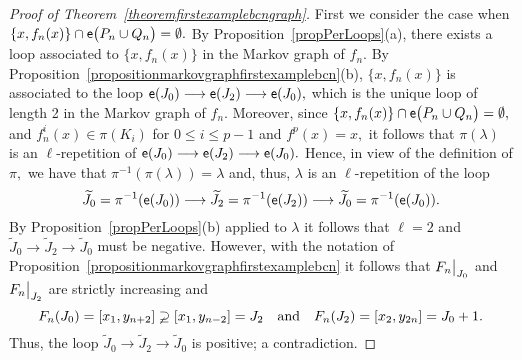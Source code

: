 \documentclass[a4paper, 11pt]{amsart}
\numberwithin{equation}{section}
\theoremstyle{customnumberedtheorem}
\theoremstyle{definitionwithbfnote}
\DeclareMathOperator{\eexp}{\textsf{\upshape e}}
\newcommand{\emap}[1]{\ensuremath{\eexp(#1)}}
\newcommand{\bigemap}[1]{\ensuremath{\eexp\bigl(#1\bigr)}}
\newcommand{\andq}[1][and]{\ensuremath{\quad\text{#1}\quad}}
\newcommand{\evalat}[1]{\bigr\rvert\sb{#1}}
\begin{document}
\begin{proof}[Proof of Theorem~\ref{theoremfirstexamplebcngraph}]
First we consider the case when
$\{x, f_n(x)\} \cap \bigemap{P_n \cup Q_n} = \emptyset.$
By Proposition~\ref{propPerLoops}(a), there exists a loop associated
to $\{x, f_n(x)\}$ in the Markov graph of $f_n.$
By Proposition~\ref{propositionmarkovgraphfirstexamplebcn}(b),
$\{x, f_n(x)\}$ is associated to the loop
$
\emap{J_0}\longrightarrow \emap{J_2} \longrightarrow \emap{J_0},
$
which is the unique loop of length 2 in the Markov graph of $f_n.$
Moreover, since $\{x, f_n(x)\} \cap \bigemap{P_n \cup Q_n} = \emptyset,$
and $f_n^i(x)\in \pi(K_i)$ for $0 \le i \le p-1$ and $f^{p}(x) = x,$
it follows that $\pi(\lambda)$ is an $\ell$-repetition of
$
\emap{J_0}\longrightarrow \emap{J_2} \longrightarrow \emap{J_0}.
$
Hence, in view of the definition of $\pi,$ we have that
$\pi^{-1}(\pi(\lambda)) = \lambda$ and, thus,
$\lambda$ is an $\ell$-repetition of the loop
\[
  \widetilde{J}_0 = \pi^{-1}(\emap{J_0}) \longrightarrow
  \widetilde{J}_2 = \pi^{-1}(\emap{J_2}) \longrightarrow
  \widetilde{J}_0 = \pi^{-1}(\emap{J_0}).
\]
By Proposition~\ref{propPerLoops}(b) applied to $\lambda$
it follows that $\ell = 2$ and
$
\widetilde{J}_0 \longrightarrow \widetilde{J}_2 \longrightarrow \widetilde{J}_0
$
must be negative.
However, with the notation of
Proposition~\ref{propositionmarkovgraphfirstexamplebcn}
it follows that $F_n\evalat{J_0}$ and $F_n\evalat{J_2}$
are strictly increasing and
\[
   F_n(J_0) = [x_1, y_{n+2}] \varsupsetneq [x_1,y_{n-2}] = J_2 \andq
   F_n(J_2) = [x_2, y_{2n}] = J_0 + 1.
\]
Thus, the loop
$
\widetilde{J}_0 \longrightarrow \widetilde{J}_2 \longrightarrow \widetilde{J}_0
$
is positive; a contradiction.


\end{proof}
\end{document}
